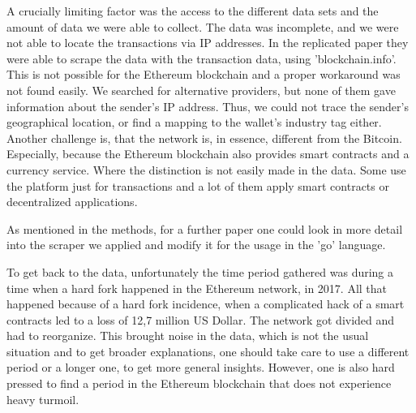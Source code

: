 A crucially limiting factor was the access to the different data sets and the amount of data we were able to collect. 
The data was incomplete, and we were not able to locate the transactions via IP addresses. 
In the replicated paper they were able to scrape the data with the transaction data, using 'blockchain.info'. 
This is not possible for the Ethereum blockchain and a proper workaround was not found easily. 
We searched for alternative providers, but none of them gave  information about the sender's IP address.
Thus, we could not trace the sender's geographical location, or find a mapping to the wallet's industry tag either. 
Another challenge is, that the network is, in essence, different from the Bitcoin.
Especially, because the Ethereum blockchain also provides smart contracts and a currency service.
Where the distinction is not easily made in the data. 
Some use the platform just for transactions and a lot of them apply smart contracts or decentralized applications. 
 
As mentioned in the methods, for a further paper one could look in more detail into the scraper we applied and modify it for the usage in the 'go' language.

To get back to the data, unfortunately the time period gathered was during a time when a hard fork happened in the Ethereum network, in 2017. 
All that happened because of a hard fork incidence, when a complicated hack of a smart contracts led to a loss of 12,7 million US Dollar.
The network got divided and had to reorganize. 
This brought noise in the data, which is not the usual situation and to get broader explanations, one should take care to use a different period or a longer one, to get more general insights. However, one is also hard pressed to find a period in the Ethereum blockchain that does not experience heavy turmoil.